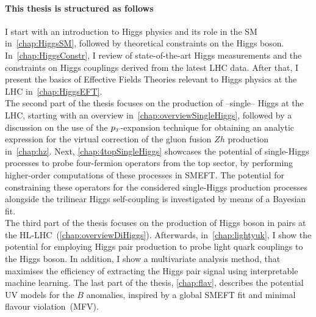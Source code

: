 \paragraph{This thesis is structured as follows\color{Cayenne}{:}}
I start with an introduction to Higgs physics and its role in the SM in~\autoref{chap:HiggsSM}, followed by theoretical constraints on the Higgs boson. In~\autoref{chap:HiggsConstr}, I review of  state-of-the-art Higgs measurements and the constraints on Higgs couplings derived from the latest LHC data. After that, I present the basics of Effective Fields Theories relevant to Higgs physics at the LHC in~\autoref{chap:HiggsEFT}. \\ The second part of the thesis focuses on the production of --single-- Higgs at the LHC, starting with an overview in~\autoref{chap:overviewSingleHiggs}, followed by a discussion on the use of the $p_{\scriptscriptstyle T}$-expansion technique for obtaining an analytic expression for the virtual correction of the gluon fusion $Zh$ production in~\autoref{chap:hz}. Next, \autoref{chap:4topSingleHiggs} showcases the potential of single-Higgs processes to probe four-fermion operators from the top sector, by performing higher-order computations of these processes in SMEFT. The potential for constraining these operators for the considered single-Higgs production processes alongside the trilinear Higgs self-coupling is investigated by means of a Bayesian fit. \\ The third part of the thesis focuses on the production of Higgs boson in pairs at the HL-LHC~(\autoref{chap:overviewDiHiggs}). Afterwards, in~\autoref{chap:lightyuk}, I show the potential for employing Higgs pair production to probe light quark couplings to the Higgs boson. In addition, I show a multivariate analysis method, that maximises the efficiency of extracting the Higgs pair signal using interpretable machine learning.  The last part of the thesis, \autoref{chap:flav}, describes the potential UV models for the $B$ anomalies, inspired by a global SMEFT fit and minimal flavour violation~(MFV). 









